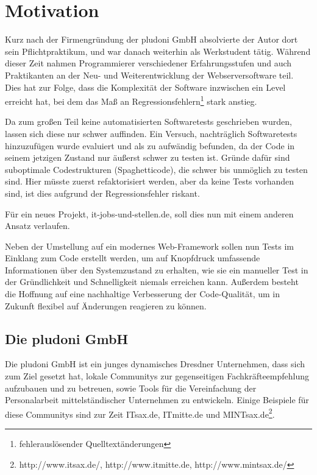 \section{Motivation}

Kurz nach der Firmengründung der pludoni GmbH absolvierte der Autor dort sein Pflichtpraktikum, und war danach weiterhin als Werkstudent tätig.
Während dieser Zeit nahmen Programmierer verschiedener Erfahrungsstufen und auch Praktikanten an der Neu- und Weiterentwicklung der Webserversoftware teil. Dies hat zur Folge, dass die Komplexität der Software inzwischen ein Level erreicht hat, bei dem das Maß an Regressionsfehlern\footnote{fehlerauslösender Quelltextänderungen} stark anstieg.

Da zum großen Teil keine automatisierten Softwaretests geschrieben wurden, lassen sich diese nur schwer auffinden. Ein Versuch, nachträglich Softwaretests hinzuzufügen wurde evaluiert und als zu aufwändig befunden, da der Code in seinem jetzigen Zustand nur äußerst schwer zu testen ist. Gründe dafür sind suboptimale Codestrukturen (Spaghetticode), die schwer bis unmöglich zu testen sind. Hier müsste zuerst refaktorisiert werden, aber da keine Tests vorhanden sind, ist dies aufgrund der Regressionsfehler riskant. %

Für ein neues Projekt, it-jobs-und-stellen.de, soll dies nun mit einem anderen Ansatz verlaufen.

Neben der Umstellung auf ein modernes Web-Framework sollen nun Tests im Einklang zum Code erstellt werden, um auf Knopfdruck  umfassende Informationen über den Systemzustand zu erhalten, wie sie ein manueller Test in der Gründlichkeit und Schnelligkeit niemals erreichen kann. Außerdem besteht die Hoffnung auf eine nachhaltige Verbesserung der Code-Qualität, um in Zukunft flexibel auf Änderungen reagieren zu können.


\subsection{Die pludoni GmbH}

Die pludoni GmbH ist ein junges dynamisches Dresdner Unternehmen, dass sich zum Ziel gesetzt hat, lokale Communitys zur gegenseitigen Fachkräfteempfehlung aufzubauen und zu betreuen, sowie Tools für die Vereinfachung der Personalarbeit mittelständischer Unternehmen zu entwickeln. Einige Beispiele für diese Communitys sind zur Zeit ITsax.de, ITmitte.de und MINTsax.de\footnote{http://www.itsax.de/, http://www.itmitte.de, http://www.mintsax.de/}.
